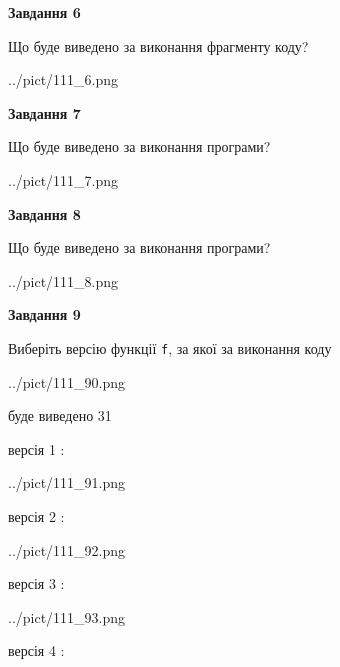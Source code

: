 \documentclass[12pt, ukrainian]{article}
\def\code#1{\Verb!#1!}
\begin{document}
{\begin {large}
{\begin {center}\textbf{Завдання 6}\end {center}}

Що буде виведено за виконання фрагменту коду?\par
\begin{center}
	{../pict/111_6.png}
\end{center}
\newpage

{\begin {center}\textbf{Завдання 7}\end {center}}

Що буде виведено за виконання програми?\par
\begin{center}
	{../pict/111_7.png}
\end{center}
\newpage

{\begin {center}\textbf{Завдання 8}\end {center}}

Що буде виведено за виконання програми?\par
\begin{center}
	{../pict/111_8.png}
\end{center}
\newpage

{\begin {center}\textbf{Завдання 9}\end {center}}

Виберіть версію функції \code{f}, за якої за виконання коду
\begin{center}
	{../pict/111_90.png}
\end{center}
буде виведено 31

\vspace{5mm}
версія 1 :

\begin{center}
	{../pict/111_91.png}
\end{center}
версія 2 :

\begin{center}
	{../pict/111_92.png}
\end{center}
версія 3 :

\begin{center}
	{../pict/111_93.png}
\end{center}
версія 4 :


\end{large}}
\end{document}
